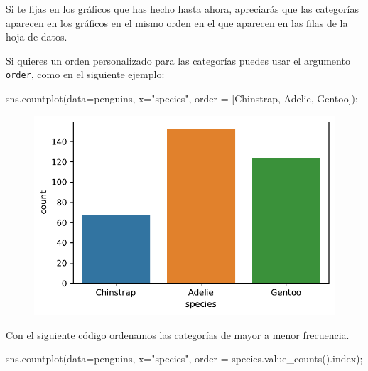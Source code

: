 \documentclass[
  a4paper,
  noprof,
  12pt,
  notoc,
  nosols,
  nobib]{mnye}
\newenvironment{Shaded}{\begin{snugshade}}{\end{snugshade}}
\newcommand{\NormalTok}[1]{\textcolor[rgb]{0.00,0.23,0.31}{#1}}
\newcommand{\OperatorTok}[1]{\textcolor[rgb]{0.37,0.37,0.37}{#1}}
\newcommand{\StringTok}[1]{\textcolor[rgb]{0.13,0.47,0.30}{#1}}
\theoremstyle{definition}
\theoremstyle{remark}
\begin{document}
Si te fijas en los gráficos que has hecho hasta ahora, apreciarás que
las categorías aparecen en los gráficos en el mismo orden en el que
aparecen en las filas de la hoja de datos.

Si quieres un orden personalizado para las categorías puedes usar el
argumento \texttt{order}, como en el siguiente ejemplo:

\begin{Shaded}
\begin{Highlighting}[]
\NormalTok{sns.countplot(data}\OperatorTok{=}\NormalTok{penguins, x}\OperatorTok{=}\StringTok{"species"}\NormalTok{, order }\OperatorTok{=}\NormalTok{ [}\StringTok{\textquotesingle{}Chinstrap\textquotesingle{}}\NormalTok{, }\StringTok{\textquotesingle{}Adelie\textquotesingle{}}\NormalTok{, }\StringTok{\textquotesingle{}Gentoo\textquotesingle{}}\NormalTok{])}\OperatorTok{;}
\end{Highlighting}
\end{Shaded}

\begin{figure}[tbph]

{\centering \includegraphics{chapters/1categorical_files/figure-pdf/cell-12-output-1.pdf}

}

\end{figure}

Con el siguiente código ordenamos las categorías de mayor a menor
frecuencia.

\begin{Shaded}
\begin{Highlighting}[]
\NormalTok{sns.countplot(data}\OperatorTok{=}\NormalTok{penguins, x}\OperatorTok{=}\StringTok{"species"}\NormalTok{, order }\OperatorTok{=}\NormalTok{ species.value\_counts().index)}\OperatorTok{;}
\end{Highlighting}
\end{Shaded}
\end{document}
